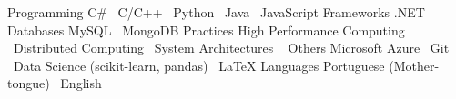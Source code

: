 

\begin{cvskills}

	\cvskill
		{Programming} %
		{C\#  \textbullet\ C/C++  \textbullet\ Python   \textbullet\ Java  \textbullet\ JavaScript } %
	\cvskill
		{Frameworks} %
		{.NET  } %
	\cvskill
		{Databases} %
		{MySQL  \textbullet\ MongoDB } %
	\cvskill
		{Practices} %
		{High Performance Computing  \textbullet\ Distributed Computing  \textbullet\ System Architectures  \textbullet\ }
	\cvskill
		{Others} %
		{Microsoft Azure  \textbullet\ Git  \textbullet\ Data Science (scikit-learn, pandas)  \textbullet\ LaTeX }
	\cvskill
		{Languages} %
		{Portuguese (Mother-tongue)  \textbullet\ English } %
\end{cvskills}